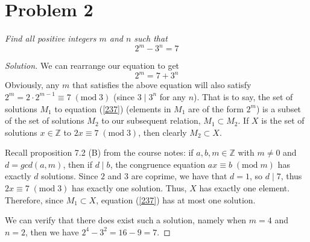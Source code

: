 \documentclass{article}
\newcommand{\Z}{{\mathbb Z}}
\begin{document}
\section{Problem 2}
{\it Find all positive integers $m$ and $n$ such that
\[
	2^m - 3^n = 7
\]
}
\begin{proof}[Solution]
	We can rearrange our equation to get
	\begin{equation}\label{237}
		2^m = 7 + 3^n
	\end{equation}
	Obviously, any $m$ that satisfies the above equation
	will also satisfy $2^m = 2\cdot2^{m-1} \equiv 7 \; (\mathrm{mod} \; 3)$
	(since $3 \mid 3^n$ for any $n$).
	That is to say, the set of solutions $M_1$ to equation (\ref{237})
	(elements in $M_1$ are of the form $2^m$)
	is a subset of the set of solutions $M_2$ to our subsequent relation,
	$M_1 \subset M_2$.
	If $X$ is the set of solutions $x\in\Z$ to $2x \equiv 7 \; (\mathrm{mod} \; 3)$,
	then clearly $M_2 \subset X$.

	Recall proposition 7.2 (B) from the course notes: if $a,b,m \in \Z$ with $m\neq0$
	and $d = gcd(a,m)$,
	then if $d \mid b$, the congruence equation $ax \equiv b \; (\mathrm{mod} \; m)$
	has exactly $d$ solutions.
	Since $2$ and $3$ are coprime, we have that $d = 1$,
	so $d \mid 7$,
	thus $2x \equiv 7 \; (\mathrm{mod} \; 3)$
	has exactly one solution.
	Thus, $X$ has exactly one element.
	Therefore, since $M_1 \subset X$,
	equation (\ref{237}) has at most one solution.

	We can verify that there does exist such a solution,
	namely when $m = 4$ and $n = 2$,
	then we have $2^4 - 3^2 = 16 - 9 = 7$.
\end{proof}
\clearpage
\end{document}
